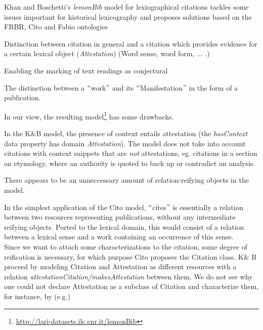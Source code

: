 \documentclass[10pt]{article}
\let\tempone\itemize
\let\temptwo\enditemize
\renewenvironment{itemize}{\tempone\setlength\itemsep{-0.5pt}}{\temptwo}
\begin{document}
 Khan and Boschetti’s \textit{lemonBib} model for lexiographical citations tackles some issues important for historical lexicography and proposes solutions based on the FRBR, Cito and Fabio ontologies\cite{PeroniShotton}

\begin{itemize}
\item Distinction between citation in general and a citation which provides evidence for a certain lexical object (\textit{Attestation}) (Word sense, word form, $ \ldots $ .)

\item	Enabling the marking of text readings as conjectural

\item The distinction between a $``$work$"$  and its $``$Manifestation$"$  in the form of a publication.
\end{itemize}

In our view, the resulting model\footnote{\url{http://lari-datasets.ilc.cnr.it/lemonBib}} has some drawbacks.

\begin{itemize}
\item In the K$\&$B model, the presence of context entails attestation (the \textit{hasContext }data property has domain \textit{Attestation}). The model does not take into account citations with context snippets that are \textit{not} attestations, eg. citations in a section on etymology, where an authority is quoted to back up or contradict an analysis.

	\item There appears to be an unneccessary amount of relation-reifying objects in the model. 


\end{itemize}

In the simplest application of the Cito model, $``$cites$"$  is essentially a relation between two resources representing publications, without any intermediate reifying objects. Ported to the lexical domain, this would consist of a relation between a lexical sense and a work containing an occurrence of this sense. \\
Since we want to attach some characterizations to the citation, some degree of reification is necessary, for which purpose Cito proposes the Citation class. K$\&$ B proceed by modeling Citation and Attestation as different resources with a relation \textit{attestationCitation/makesAttestation }between them. We do not see why one could not declare Attestation as a subclass of Citation and characterize them, for instance, by (e.g.)
\end{document}
